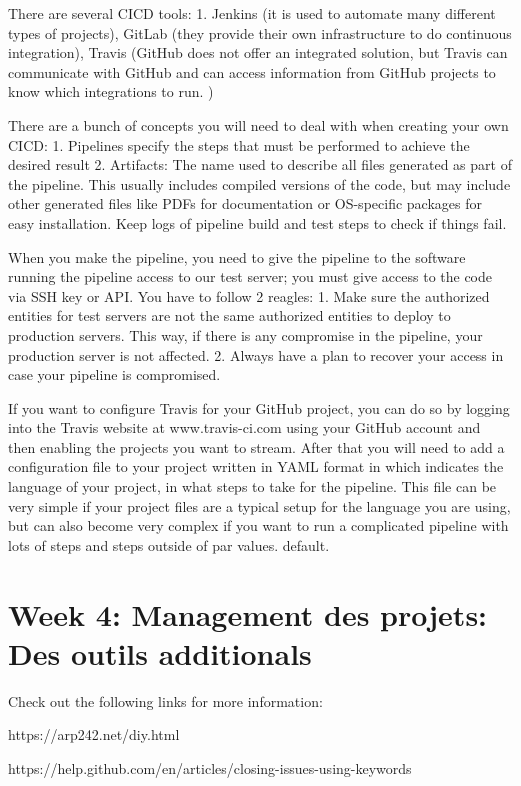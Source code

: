 \documentclass[11pt, onecolumn]{article}
\begin{document}
There are several CICD tools: 1. Jenkins (it is used to automate many different types of projects), GitLab (they provide their own infrastructure to do continuous integration), Travis (GitHub does not offer an integrated solution, but Travis can communicate with GitHub and can access information from GitHub projects to know which integrations to run. )

There are a bunch of concepts you will need to deal with when creating your own CICD:
1. Pipelines specify the steps that must be performed to achieve the desired result
2. Artifacts: The name used to describe all files generated as part of the pipeline. This usually includes compiled versions of the code, but may include other generated files like PDFs for documentation or OS-specific packages for easy installation. Keep logs of pipeline build and test steps to check if things fail.

When you make the pipeline, you need to give the pipeline to the software running the pipeline access to our test server; you must give access to the code via SSH key or API. You have to follow 2 reagles:
1. Make sure the authorized entities for test servers are not the same authorized entities to deploy to production servers. This way, if there is any compromise in the pipeline, your production server is not affected.
2. Always have a plan to recover your access in case your pipeline is compromised.

If you want to configure Travis for your GitHub project, you can do so by logging into the Travis website at www.travis-ci.com using your GitHub account and then enabling the projects you want to stream. After that you will need to add a configuration file to your project written in YAML format in which indicates the language of your project, in what steps to take for the pipeline. This file can be very simple if your project files are a typical setup for the language you are using, but can also become very complex if you want to run a complicated pipeline with lots of steps and steps outside of par values. default.


\section{Week 4: Management des projets: Des outils additionals}

Check out the following links for more information:

    https://arp242.net/diy.html 

    https://help.github.com/en/articles/closing-issues-using-keywords
\end{document}
